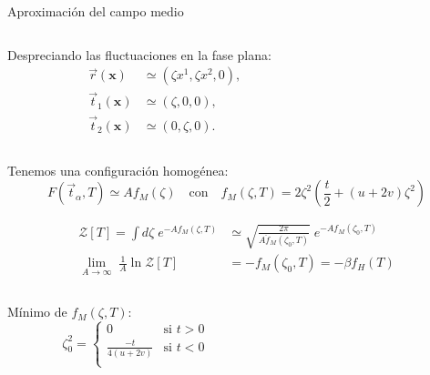 \documentclass[xcolor=dvipsnames]{beamer}
\begin{document}
\begin{frame}{Aproximación del campo medio}
  \begin{columns}%
    \begin{column}{6.2cm}
      \centering
      Despreciando las fluctuaciones en la fase plana:
     \begin{align*}
       \vec{r}(\mathbf{x})&\simeq(\zeta x^1,\zeta x^2,0),\\
       \vec{t}_1(\mathbf{x})&\simeq(\zeta ,0,0),\\
       \vec{t}_2(\mathbf{x})&\simeq(0,\zeta,0).
     \end{align*}
     
    \end{column}
    \begin{column}{6.25cm}
      \centering
      \begin{figure}[h]
      \resizebox{\columnwidth}{!}{}
      \end{figure} 
    \end{column}
  \end{columns}
Tenemos una configuración homogénea:
\begin{equation*}
  F(\vec{t}_{\alpha},T)\simeq Af_M(\zeta)\quad \text{con}\quad f_M(\zeta,T)=2\zeta^2\left( \frac{t}{2} +(u+2v)\zeta^2\right)
\end{equation*}
\end{frame}
\begin{frame}
\begin{align*}
 \mathcal{Z}[T]=\int d\zeta\;e^{-Af_M(\zeta,T)}&\simeq\sqrt{\frac{2\pi}{A\ddot{f}_M(\zeta_0,T)}}\;
 e^{-Af_M(\zeta_0,T)}\\
 \lim_{A\rightarrow \infty}\; \frac{1}{A} \ln \mathcal{Z}[T]&=-f_M(\zeta_0,T)=-\beta f_H(T)
\end{align*}
\begin{columns}[T]
    \begin{column}{5.8cm}
      \centering
      Mínimo de $f_M(\zeta,T)$:
      $$\zeta^2_0=\begin{cases}
        0& \text{si $t>0$}\\
        \frac{-t}{4(u+2v)}& \text{si $t<0$}\\
      \end{cases}$$
\end{column}
\begin{column}{5.8cm}
      \centering
      \begin{figure}[h]
      \resizebox{\columnwidth}{!}{}
      \end{figure} 
    \end{column}
  \end{columns}
\end{frame}
\end{document}
